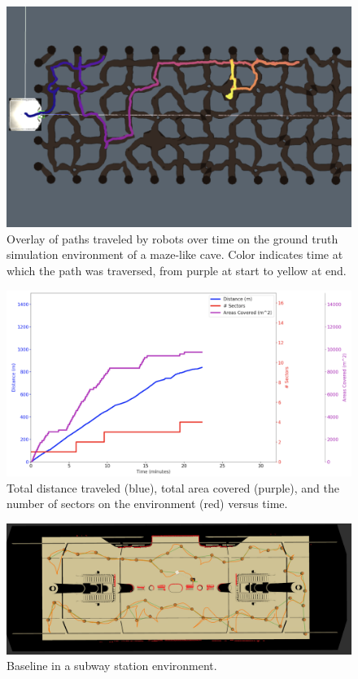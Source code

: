 \documentclass{article}
\begin{document}
\begin{figure}[t!]
  \centering
  \includegraphics[width=.6\textwidth]{figures/may-demo-path.png}
  \caption{Overlay of paths traveled by robots over time on the ground truth simulation environment of a maze-like cave.  Color indicates time at which the path was traversed, from purple at start to yellow at end.}
  \label{fig:may-demo-path}
\end{figure}
\begin{figure}[!t]
  \centering
  \includegraphics[width=.75\textwidth]{figures/may-demo-plot.png}
  \caption{Total distance traveled (blue), total area covered (purple), and the number of sectors on the environment (red) versus  time.}
  \label{fig:may-demo-plot}
\end{figure}


\begin{figure}[!t]
  \centering
  \includegraphics[width=.75\textwidth]{figures/station-baseline.png}
  \caption{Baseline in a subway station environment.}
  \label{fig:station-baseline}
\end{figure}
\end{document}
